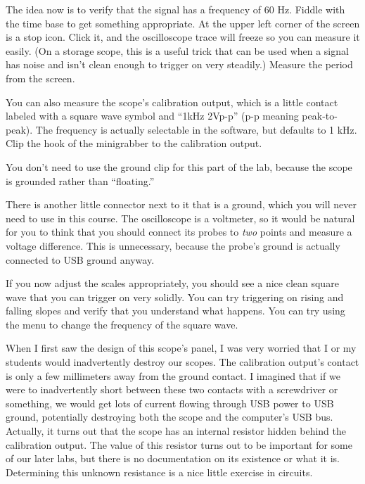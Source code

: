 The idea now is to verify that the signal has a frequency of 60 Hz. Fiddle with the time
base to get something appropriate. At the upper left corner of the screen is a stop icon.
Click it, and the oscilloscope trace will freeze so you can measure it easily. (On a storage
scope, this is a useful trick that can be used when a signal has noise and isn't clean enough
to trigger on very steadily.) Measure the period from the screen.


You can also measure the scope's calibration output, which is a little
contact labeled with a square wave symbol and ``1kHz 2Vp-p'' (p-p
meaning peak-to-peak).  The frequency is actually selectable in the
software, but defaults to 1 kHz.  Clip the hook of the minigrabber to
the calibration output.

You don't need to use the ground clip for this part of the lab, because the
scope is grounded rather than ``floating.''

There is another little connector next to it that
is a ground, which you will never need to use in this course.
The oscilloscope is a voltmeter, so it would be
natural for you to think that you should connect its probes to \emph{two} points and measure a voltage
difference. This is unnecessary, because the probe's ground is actually connected to USB ground anyway.

If you now adjust the scales appropriately, you should see a nice clean square wave that you can trigger
on very solidly. You can try triggering on rising and falling slopes and verify that you understand what
happens. You can try using the menu to change the frequency of the square wave.


When I first saw the design of this scope's panel, I was very worried that I or
my students would inadvertently destroy our scopes. The calibration output's contact is only
a few millimeters away from the ground contact. I imagined that if we were to inadvertently
short between these two contacts with a screwdriver or something, we would get lots of
current flowing through USB power to USB ground, potentially destroying both the
scope and the computer's USB bus. Actually, it turns out that the scope has an internal
resistor hidden behind the calibration output. The value of this resistor turns out to
be important for some of our later labs, but there is no documentation on its existence
or what it is. Determining this unknown resistance is a nice little exercise in circuits.

